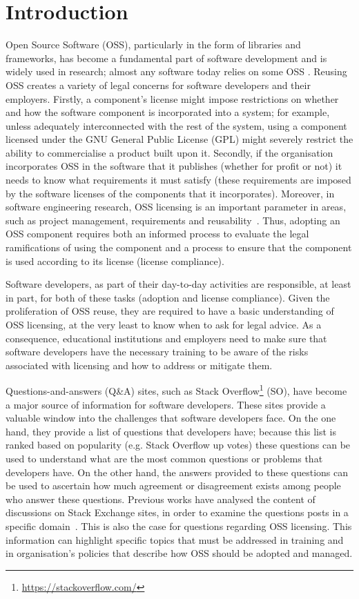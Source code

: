 \documentclass{elsarticle}
\begin{document}
\section{Introduction}

Open Source Software (OSS), particularly in the form of libraries and frameworks, has become a fundamental part of software development and is widely used in research; almost any software today relies on some OSS \cite{synopsys2020,sonatype2020}. Reusing OSS creates a variety of legal concerns for software developers and their employers. Firstly, a component's license might impose restrictions on whether and how the software component is incorporated into a system; for example, unless adequately interconnected with the rest of the system, using a component licensed under the GNU General Public License (GPL) might severely restrict the ability to commercialise a product built upon it. Secondly, if the organisation incorporates OSS in the software that it publishes (whether for profit or not) it needs to know what requirements it must satisfy (these requirements are imposed by the software licenses of the components that it incorporates). Moreover, in software engineering research, OSS licensing is an important parameter in areas, such as project management, requirements and reusability~\cite{haefliger2008code}. Thus, adopting an OSS component requires both an informed process to evaluate the legal ramifications of using the component and a process to ensure that the component is used according to its license (license compliance).  

Software developers, as part of their day-to-day activities are responsible, at least in part, for both of these tasks (adoption and license compliance). Given the proliferation of OSS reuse, they are required to have a basic understanding of OSS licensing, at the very least to know when to ask for legal advice. As a consequence, educational institutions and employers need to make sure that software developers have the necessary training to be aware of the risks associated with licensing and how to address or mitigate them.

Questions-and-answers (Q\&A) sites, such as Stack Overflow\footnote{\url{https://stackoverflow.com/}} (SO), have become a major source of information for software developers. These sites provide a valuable window into the challenges that software developers face. On the one hand, they provide a list of questions that developers have; because this list is ranked based on popularity (e.g. Stack Overflow up votes) these questions can be used to understand what are the most common questions or problems that developers have. On the other hand, the answers provided to these questions can be used to ascertain how much agreement or disagreement exists among people who answer these questions. Previous works have analysed the content of discussions on Stack Exchange sites, in order to examine the questions posts in a specific domain~\cite{abdellatif2020challenges,ahmed2018concurrency}. This is also the case for questions regarding OSS licensing. This information can highlight specific topics that must be addressed in training and in organisation's policies that describe how OSS should be adopted and managed.
\end{document}
